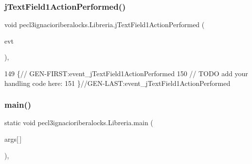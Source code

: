 \mbox{\label{classpecl3ignacioriberalocks_1_1_libreria_af0194299f3a370c2e5840e7f6501d61e}} 
\subsubsection{\texorpdfstring{j\+Text\+Field1\+Action\+Performed()}{jTextField1ActionPerformed()}}
{\footnotesize\ttfamily void pecl3ignacioriberalocks.\+Libreria.\+j\+Text\+Field1\+Action\+Performed (\begin{DoxyParamCaption}\item[{java.\+awt.\+event.\+Action\+Event}]{evt }\end{DoxyParamCaption})\hspace{0.3cm}{\ttfamily [inline]}, {\ttfamily [private]}}


\begin{DoxyCode}
149                                                                             \{\textcolor{comment}{//
      GEN-FIRST:event\_jTextField1ActionPerformed}
150         \textcolor{comment}{// TODO add your handling code here:}
151     \}\textcolor{comment}{//GEN-LAST:event\_jTextField1ActionPerformed}
\end{DoxyCode}
\mbox{\label{classpecl3ignacioriberalocks_1_1_libreria_a8fd9ca2a46f817d6a1520ed4dc25b678}} 
\subsubsection{\texorpdfstring{main()}{main()}}
{\footnotesize\ttfamily static void pecl3ignacioriberalocks.\+Libreria.\+main (\begin{DoxyParamCaption}\item[{String}]{args\mbox{[}$\,$\mbox{]} }\end{DoxyParamCaption})\hspace{0.3cm}{\ttfamily [inline]}, {\ttfamily [static]}}


